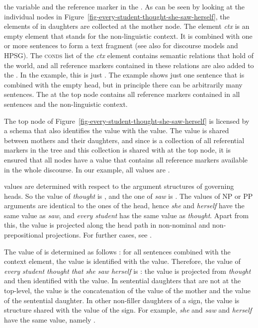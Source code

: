 \documentclass[output=paper,biblatex,babelshorthands,newtxmath,draftmode,colorlinks,citecolor=brown]{langscibook}
\begin{document}
the variable  and the reference marker  in the \listlu. As can be seen by looking at the
individual nodes in Figure~\ref{fig-every-student-thought-she-saw-herself}, the elements of \listlu
in daughters are collected at the mother node. The element \emph{ctx} is an empty element that
stands for the non-linguistic context. It is combined with one or more sentences to form a text
fragment (see also  for discourse models and HPSG). The \textsc{conds}
list of the \emph{ctx} element contains semantic relations that hold of the world, and all reference
markers contained in these relations are also added to the \listlul. In the example, this is just
. The example shows just one sentence that is combined with the empty head, but in principle
there can be arbitrarily many sentences. The \listlul at the top node contains all reference markers contained in
all sentences and the non-linguistic context. 

The top node of Figure~\ref{fig-every-student-thought-she-saw-herself} is licensed by a schema that
also identifies the \listu value with the \listlu value. The \listu value is shared between mothers
and their daughters, and since \listlu is a collection of all referential markers in the tree and
this collection is shared with \listu at the top node, it is ensured that all nodes have a \listu
value that contains all reference markers available in the whole discourse. In our example, all
\listu values are .

\lista values are determined with respect to the argument structures of governing heads. So the
\lista value of \emph{thought} is , and the one of \emph{saw} is
. The \lista values of NP or PP arguments are identical to the ones of the head,
hence \emph{she} and \emph{herself} have the same \lista value as \emph{saw}, and \emph{every
  student} has the same \lista value as \emph{thought}. Apart from this, the \lista value is
projected along the head path in non-nominal and non-prepositional projections. For further cases,
see \citet[]{Branco2002a}.

The value of \listz is determined as follows \citep[]{Branco2002a}: for all sentences combined with the context element,
the \listz value is identified with the \lista value. Therefore, the \listz value of \emph{every
  student thought that she saw herself} is : the \lista value is
projected from \emph{thought} and then identified with the \listz value. In sentential daughters
that are not at the top-level, the \listz value is the concatenation of the \listz value of the
mother and the \lista value of the sentential daughter. In other non-filler daughters of a sign, the
\listz value is structure shared with the \listz value of the sign. For example, \emph{she} and
\emph{saw} and \emph{herself} have the same \listz value, namely .
\end{document}
